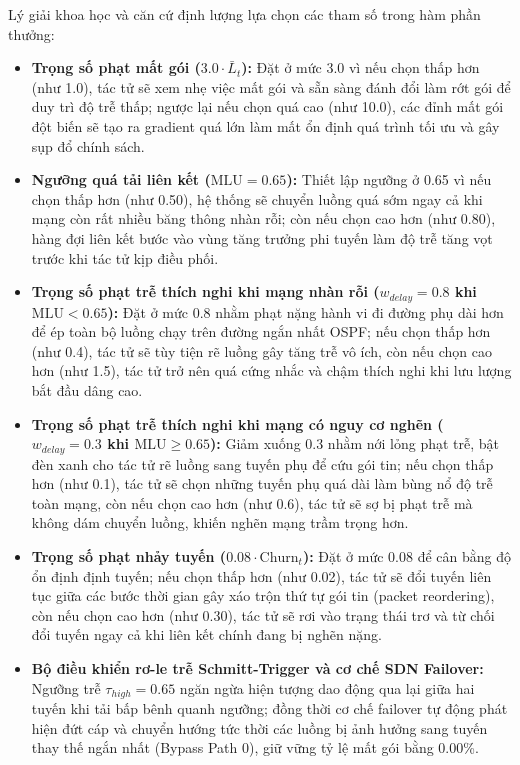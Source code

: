 \documentclass[11pt,a4paper]{article}
\begin{document}
Lý giải khoa học và căn cứ định lượng lựa chọn các tham số trong hàm phần thưởng:
\begin{itemize}[leftmargin=1.5em, itemsep=0.3ex]
    \item \textbf{Trọng số phạt mất gói ($3.0 \cdot \bar{L}_t$):} Đặt ở mức 3.0 vì nếu chọn thấp hơn (như 1.0), tác tử sẽ xem nhẹ việc mất gói và sẵn sàng đánh đổi làm rớt gói để duy trì độ trễ thấp; ngược lại nếu chọn quá cao (như 10.0), các đỉnh mất gói đột biến sẽ tạo ra gradient quá lớn làm mất ổn định quá trình tối ưu và gây sụp đổ chính sách.
    \item \textbf{Ngưỡng quá tải liên kết ($\text{MLU} = 0.65$):} Thiết lập ngưỡng ở 0.65 vì nếu chọn thấp hơn (như 0.50), hệ thống sẽ chuyển luồng quá sớm ngay cả khi mạng còn rất nhiều băng thông nhàn rỗi; còn nếu chọn cao hơn (như 0.80), hàng đợi liên kết bước vào vùng tăng trưởng phi tuyến làm độ trễ tăng vọt trước khi tác tử kịp điều phối.
    \item \textbf{Trọng số phạt trễ thích nghi khi mạng nhàn rỗi ($w_{delay} = 0.8$ khi $\text{MLU} < 0.65$):} Đặt ở mức 0.8 nhằm phạt nặng hành vi đi đường phụ dài hơn để ép toàn bộ luồng chạy trên đường ngắn nhất OSPF; nếu chọn thấp hơn (như 0.4), tác tử sẽ tùy tiện rẽ luồng gây tăng trễ vô ích, còn nếu chọn cao hơn (như 1.5), tác tử trở nên quá cứng nhắc và chậm thích nghi khi lưu lượng bắt đầu dâng cao.
    \item \textbf{Trọng số phạt trễ thích nghi khi mạng có nguy cơ nghẽn ($w_{delay} = 0.3$ khi $\text{MLU} \ge 0.65$):} Giảm xuống 0.3 nhằm nới lỏng phạt trễ, bật đèn xanh cho tác tử rẽ luồng sang tuyến phụ để cứu gói tin; nếu chọn thấp hơn (như 0.1), tác tử sẽ chọn những tuyến phụ quá dài làm bùng nổ độ trễ toàn mạng, còn nếu chọn cao hơn (như 0.6), tác tử sẽ sợ bị phạt trễ mà không dám chuyển luồng, khiến nghẽn mạng trầm trọng hơn.
    \item \textbf{Trọng số phạt nhảy tuyến ($0.08 \cdot \text{Churn}_t$):} Đặt ở mức 0.08 để cân bằng độ ổn định định tuyến; nếu chọn thấp hơn (như 0.02), tác tử sẽ đổi tuyến liên tục giữa các bước thời gian gây xáo trộn thứ tự gói tin (packet reordering), còn nếu chọn cao hơn (như 0.30), tác tử sẽ rơi vào trạng thái trơ và từ chối đổi tuyến ngay cả khi liên kết chính đang bị nghẽn nặng.
    \item \textbf{Bộ điều khiển rơ-le trễ Schmitt-Trigger và cơ chế SDN Failover:} Ngưỡng trễ $\tau_{high} = 0.65$ ngăn ngừa hiện tượng dao động qua lại giữa hai tuyến khi tải bấp bênh quanh ngưỡng; đồng thời cơ chế failover tự động phát hiện đứt cáp và chuyển hướng tức thời các luồng bị ảnh hưởng sang tuyến thay thế ngắn nhất (Bypass Path 0), giữ vững tỷ lệ mất gói bằng 0.00\%.
\end{itemize}
\end{document}
